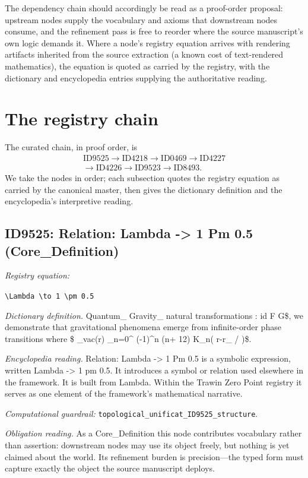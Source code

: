 \documentclass[11pt]{article}
\theoremstyle{remark}
\begin{document}
The dependency chain should accordingly be read as a proof-order proposal: upstream nodes supply the vocabulary and axioms that downstream nodes consume, and the refinement pass is free to reorder where the source manuscript's own logic demands it. Where a node's registry equation arrives with rendering artifacts inherited from the source extraction (a known cost of text-rendered mathematics), the equation is quoted as carried by the registry, with the dictionary and encyclopedia entries supplying the authoritative reading.

\section{The registry chain}
\label{sec:chain}

The curated chain, in proof order, is
\begin{equation*}
\begin{gathered}
\text{ID9525} \to \text{ID4218} \to \text{ID0469} \to \text{ID4227} \\
\to \text{ID4226} \to \text{ID9523} \to \text{ID8493}.
\end{gathered}
\end{equation*}
We take the nodes in order; each subsection quotes the registry equation as carried by the canonical master, then gives the dictionary definition and the encyclopedia's interpretive reading.

\subsection{ID9525: Relation: Lambda -> 1 Pm 0.5 (Core\_Definition)}

\noindent\textit{Registry equation:}\par
{\small\texttt{\textbackslash{}Lambda \textbackslash{}to 1 \textbackslash{}pm 0.5}}\par\medskip
\noindent\textit{Dictionary definition.} Quantum\_ Gravity\_ natural transformations : id F G\$, we demonstrate that gravitational phenomena emerge from infinite-order phase transitions where \$ \_vac(r) \_n=0\textasciicircum{} (-1)\textasciicircum{}n (n+ 12) K\_n( r-r\_ / )\$.\par\medskip
\noindent\textit{Encyclopedia reading.} Relation: Lambda -> 1 Pm 0.5 is a symbolic expression, written Lambda -> 1 pm 0.5. It introduces a symbol or relation used elsewhere in the framework. It is built from Lambda. Within the Trawin Zero Point registry it serves as one element of the framework's mathematical narrative.
\par\medskip\noindent\textit{Computational guardrail:} \texttt{topological\_unificat\_ID9525\_structure}.
\par\medskip\noindent\textit{Obligation reading.} As a Core\_Definition this node contributes vocabulary rather than assertion: downstream nodes may use its object freely, but nothing is yet claimed about the world. Its refinement burden is precision---the typed form must capture exactly the object the source manuscript deploys.
\end{document}
